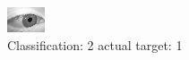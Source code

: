 \begin{figure}[h!]
\begin{center}
\includegraphics[width=0.60\columnwidth]{figures/ID2760_class_2_target_1.png}
\end{center}
\caption{ Classification: 2 actual target: 1}
\label{fig:ID2760_class_2_target_1}
\end{figure}
